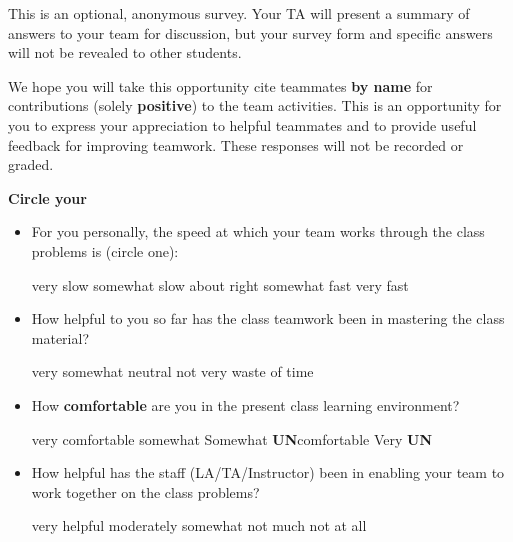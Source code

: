 \documentclass[handout]{mcs}
\begin{document}

This is an optional, anonymous survey.  Your TA will present a summary
of answers to your team for discussion, but your survey form and
specific answers will not be revealed to other students.

We hope you will take this opportunity cite teammates \textbf{by name}
for contributions (solely \textbf{positive}) to the team activities.
This is an opportunity for you to express your appreciation to helpful
teammates and to provide useful feedback for improving teamwork.
These responses will not be recorded or graded.
\begin{center}
\textbf{Circle your}\quad   \teaminfo 
\end{center}

\begin{itemize}

\item For you personally, the speed at which your team works through
  the class problems is (circle one):

very slow\hspace{0.4in} somewhat slow\hspace{0.4in} about
right\hspace{0.4in} somewhat fast\hspace{0.4in} very fast

\item How helpful to you so far has the class teamwork been in
  mastering the class material?

very\hspace{0.5in} somewhat \hspace{0.5in} neutral\hspace{0.5in} not
very \hspace{0.5in} waste of time

\item How \textbf{comfortable} are you in the present class learning environment?

very comfortable \hspace{0.5in} somewhat\hspace{0.5in}
Somewhat \textbf{UN}comfortable \hspace{0.5in} Very \textbf{UN}

\item How helpful has the staff (LA/TA/Instructor) been in enabling
  your team to work together on the class problems?

very helpful \hspace{0.5in} moderately\hspace{0.5in}
somewhat \hspace{0.5in} not much \hspace{0.5in} not at all


\end{itemize}
\end{document}
